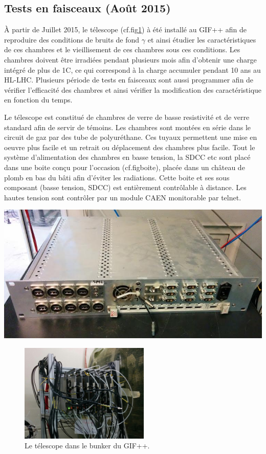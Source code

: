\subsection{Tests en faisceaux (Août 2015)}
À partir de Juillet 2015, le télescope (cf.fig\ref{GIFppChambers}) à été installé au GIF++ afin de reproduire des conditions de bruits de fond $\gamma$ et ainsi étudier les caractéristiques de ces chambres et le vieillisement de ces chambres sous ces conditions. Les chambres doivent être irradiées pendant plusieurs mois afin d'obtenir une charge intégré de plus de 1C, ce qui correspond à la charge accumuler pendant 10 ans au HL-LHC.
Plusieurs période de tests en faisceaux sont aussi programmer afin de vérifier l'efficacité des chambres et ainsi vérifier la modification des caractéristique en fonction du temps.

Le télescope est constitué de chambres de verre de basse resistivité et de verre standard afin de servir de témoins. Les chambres sont montées en série dans le circuit de gaz par des tube de polyuréthane. Ces tuyaux permettent une mise en oeuvre plus facile et un retrait ou déplacement des chambres plus facile. Tout le système d'alimentation des chambres en basse tension, la SDCC etc sont placé dans une boite conçu pour l'occasion (cf.fig{boite}), placée dans un château de plomb en bas du bâti afin d'éviter les radiations. Cette boite et ses sous composant (basse tension, SDCC) est entièrement contrôlable à distance. Les hautes tension sont contrôler par un module CAEN monitorable par telnet.

\marginpar
{
	\centering
	\includegraphics[width=1.0\marginparwidth]{GLA/boite.jpg}
	\label{boite}
}

\begin{figure}[!ht]
	\centering
	\includegraphics[width=0.55\textwidth]{GLA/GIFppChambers.png}
	\caption{Le télescope dans le bunker du GIF++.}
	\label{GIFppChambers}
\end{figure}

